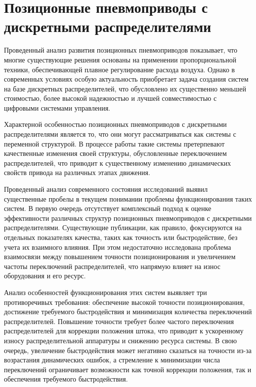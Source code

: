 \section{Позиционные пневмоприводы с дискретными распределителями}

Проведенный анализ развития позиционных пневмоприводов показывает, что многие существующие
решения основаны на применении пропорциональной техники,
обеспечивающей плавное регулирование расхода воздуха. Однако в современных условиях особую актуальность приобретает
задача создания систем на базе дискретных распределителей, что обусловлено их существенно меньшей
стоимостью, более высокой надежностью и лучшей совместимостью с цифровыми системами управления.

Характерной особенностью позиционных пневмоприводов с дискретными распределителями является то, что они могут рассматриваться как системы с переменной
структурой. В процессе работы такие системы претерпевают качественные изменения своей структуры, обусловленные переключением распределителей, что приводит к
существенному изменению динамических свойств привода на различных этапах движения.

Проведенный анализ современного состояния исследований выявил существенные пробелы в текущем понимании проблемы функционирования
таких систем. В первую очередь отсутствует комплексный подход к оценке эффективности различных структур позиционных пневмоприводов с дискретными распределителями.
Существующие публикации, как правило, фокусируются на отдельных показателях качества, таких как точность или быстродействие, без учета их взаимного влияния. При этом
недостаточно исследована проблема взаимосвязи между повышением точности позиционирования и увеличением частоты переключений распределителей, что напрямую влияет на износ оборудования и его ресурс.

Анализ особенностей функционирования этих систем выявляет три противоречивых требования: обеспечение высокой точности
позиционирования, достижение требуемого быстродействия и минимизация количества переключений распределителей. Повышение точности
требует более частого переключения распределителей для коррекции положения штока, что приводит к ускоренному износу распределительной аппаратуры и снижению ресурса системы.
В свою очередь, увеличение быстродействия может негативно сказаться на точности из-за возрастания динамических ошибок, а стремление к минимизации числа переключений ограничивает
возможности как точной коррекции положения, так и обеспечения требуемого быстродействия.

